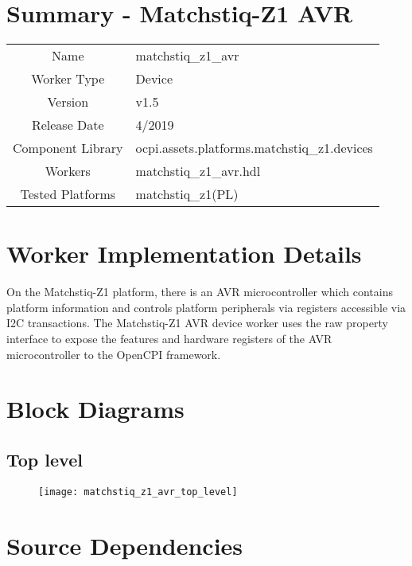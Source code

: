 \documentclass{article}
\author{} %
\date{Version \docVersion} %
\title{\docTitle}
\def\docVersion{1.5}
\def\comp{matchstiq\_z1\_avr}
\def\Comp{Matchstiq-Z1 AVR}
\begin{document}
\section*{Summary - \Comp}
\begin{tabular}{|c|M{13.5cm}|}
	\hline
	                  &                                        			\\
	\hline
	Name              & \comp                                  			\\
	\hline
	Worker Type       & Device                                 			\\
	\hline
	Version           & v\docVersion \\
	\hline
	Release Date      & 4/2019 \\
	\hline
	Component Library & ocpi.assets.platforms.matchstiq\_z1.devices		\\
	\hline
	Workers           & \comp.hdl                              			\\
	\hline
	Tested Platforms  & matchstiq\_z1(PL)                       			\\
	\hline
\end{tabular}

\section*{Worker Implementation Details}
On the Matchstiq-Z1 platform, there is an AVR microcontroller which contains platform information and controls platform peripherals via registers accessible via I2C transactions. The \Comp{} device worker uses the raw property interface to expose the features and hardware registers of the AVR microcontroller to the OpenCPI framework.

\section*{Block Diagrams}
\subsection*{Top level}
\begin{figure}[ht]
	\centerline{\texttt{[image: matchstiq\_z1\_avr\_top\_level]}}
	\label{fig:tb}
\end{figure}

\section*{Source Dependencies}
\end{document}
